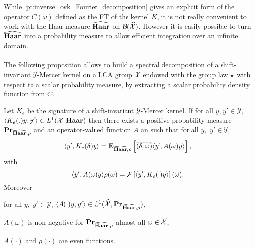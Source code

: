 While \cref{pr:inverse_ovk_Fourier_decomposition} gives an explicit form of the
operator $C(\omega)$ defined as the \acl{FT} of the kernel $K$, it is not
really convenient to work with the Haar measure $\widehat{\mathbf{Haar}}$ on
$\mathcal{B}(\widehat{\mathcal{X}})$. However it is easily possible to turn
$\widehat{\mathbf{Haar}}$ into a probability measure to allow efficient integration over
an infinite domain.
\paragraph{}
The following proposition allows to build a spectral decomposition of a
shift-invariant $\mathcal{Y}$-Mercer kernel on a \acs{LCA} group $\mathcal{X}$
endowed with the group law $\star$ with respect to a scalar probability
measure, by extracting a scalar probability density function from $C$.
\begin{proposition}
\label{pr:spectral}
    Let $K_e$ be the signature of a shift-invariant $\mathcal{Y}$-Mercer
    kernel. If for all $y$, $y' \in\mathcal{Y}$, $\langle K_e(.)y,y'\rangle\in
    L^1(\mathcal{X},\mathbf{Haar})$ then there exists a positive probability measure
    ${\mathbf{{Pr}}}_{\widehat{\mathbf{Haar}},\rho}$ and an operator-valued function $A$ an
    such that for all $y,$ $y'\in\mathcal{Y}$,
    \begin{dmath}
        \label{eq:expectation_spec} \inner{y', K_e(\delta)y}
        =\expectation_{\dual{\Haar},\rho}\left[\conj{\pairing{\delta,
        \omega}}\inner{y', A(\omega)y}\right],
    \end{dmath}
    with
    \begin{dmath}
        \label{eq:comega} \inner{y', A(\omega)y}\rho(\omega) = \FT{\inner{y',
        K_e(\cdot)y}}(\omega).
    \end{dmath}
    Moreover
    \begin{propenum}
        \item for all $y,$ $y'\in\mathcal{Y}$, $\langle A(.)y,y'\rangle\in
        L^1(\widehat{\mathcal{X}}, {\mathbf{{Pr}}}_{\widehat{\mathbf{Haar}},\rho})$,
        \item $A(\omega)$ is non-negative for
        ${\mathbf{{Pr}}}_{\widehat{\mathbf{Haar}},\rho}$-almost all
        $\omega\in\widehat{\mathcal{X}}$,
        \item $A(\cdot)$ and $\rho(\cdot)$ are even functions.
    \end{propenum}
\end{proposition}
